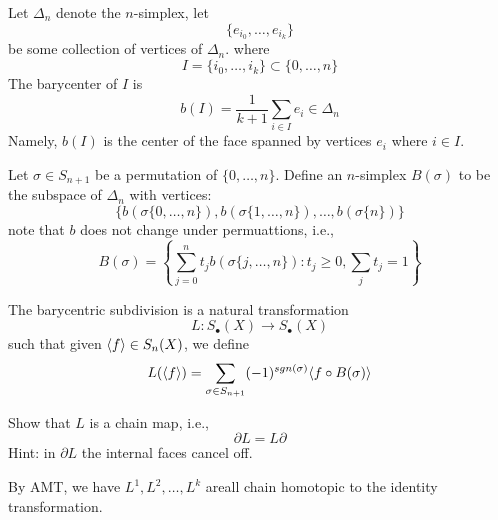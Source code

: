 \begin{defn}[barycenter]
    Let $\Delta_n$ denote the $n$-simplex, let
    \begin{equation*}
        \{e_{i_0},\dots, e_{i_k}\}
    \end{equation*}
    be some collection of vertices of $\Delta_n$. where 
    \begin{equation*}
        I=\{i_0,\dots,i_k\}\subset\{0,\dots, n\}
    \end{equation*}
    The barycenter of $I$ is 
    \begin{equation*}
        b(I)=\frac{1}{k+1}\sum_{i\in I}e_i\in \Delta_n
    \end{equation*}
    Namely, $b(I)$ is the center of the face spanned by vertices $e_i$ where $i\in I$.
\end{defn}
Let $\sigma\in S_{n+1}$ be a permutation of $\{0,\dots, n\}$. Define an $n$-simplex $B(\sigma)$ to be the subspace of $\Delta_n$ with vertices:
\begin{equation*}
    \{b(\sigma\{0,\dots,n\}), b(\sigma\{1,\dots,n\}), \dots, b(\sigma\{n\})\}
\end{equation*}
note that $b$ does not change under permuattions, i.e., 
\begin{equation*}
    B(\sigma)=\left\{\sum_{j=0}^nt_jb(\sigma\{j,\dots,n\}):t_j\geq 0, \sum_jt_j=1\right\}
\end{equation*}
\begin{defn}
    The barycentric subdivision is a natural transformation 
    \begin{equation*}
        L: S_\bullet(X)\to S_\bullet(X)
    \end{equation*}
    such that given $\langle f\rangle\in S_n(X)$, we define 
    \begin{equation*}
        L(\langle f\rangle)=\sum_{\sigma\in S_{n+1}}(-1)^{sgn(\sigma)}\langle f\circ B(\sigma)\rangle
    \end{equation*}
\end{defn}
\begin{prob}[HW(3.4)]
    Show that $L$ is a chain map, i.e., 
    \begin{equation*}
        \partial L=L\partial
    \end{equation*}
    Hint: in $\partial L$ the internal faces cancel off.
\end{prob}
\begin{cor}
    By AMT, we have $L^1, L^2,\dots, L^k$ areall chain homotopic to the identity transformation.
\end{cor}

